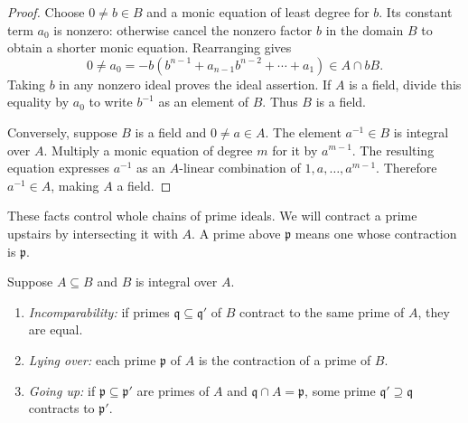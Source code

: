 \begin{proof}
Choose $0\ne b\in B$ and a monic equation of least degree for $b$. Its constant term $a_0$ is nonzero: otherwise cancel the nonzero factor $b$ in the domain $B$ to obtain a shorter monic equation. Rearranging gives
\[
 0\ne a_0=-b(b^{n-1}+a_{n-1}b^{n-2}+\cdots+a_1)\in A\cap bB.
\]
Taking $b$ in any nonzero ideal proves the ideal assertion. If $A$ is a field, divide this equality by $a_0$ to write $b^{-1}$ as an element of $B$. Thus $B$ is a field.

Conversely, suppose $B$ is a field and $0\ne a\in A$. The element $a^{-1}\in B$ is integral over $A$. Multiply a monic equation of degree $m$ for it by $a^{m-1}$. The resulting equation expresses $a^{-1}$ as an $A$-linear combination of $1,a,\ldots,a^{m-1}$. Therefore $a^{-1}\in A$, making $A$ a field.
\end{proof}

These facts control whole chains of prime ideals. We will contract a prime upstairs by intersecting it with $A$. A prime above $\mathfrak p$ means one whose contraction is $\mathfrak p$.

\begin{theorem}\label{thm:goingup}
Suppose $A\subseteq B$ and $B$ is integral over $A$.
\begin{enumerate}[label=(\alph*)]
\item \emph{Incomparability:} if primes $\mathfrak q\subseteq\mathfrak q'$ of $B$ contract to the same prime of $A$, they are equal.
\item \emph{Lying over:} each prime $\mathfrak p$ of $A$ is the contraction of a prime of $B$.
\item \emph{Going up:} if $\mathfrak p\subseteq\mathfrak p'$ are primes of $A$ and $\mathfrak q\cap A=\mathfrak p$, some prime $\mathfrak q'\supseteq\mathfrak q$ contracts to $\mathfrak p'$.
\end{enumerate}
\end{theorem}

